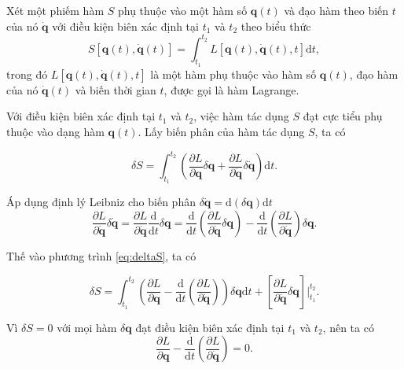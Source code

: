 Xét một phiếm hàm \(S\) phụ thuộc vào một hàm số \(\mathbf{q}(t)\) và đạo hàm theo biến \(t\) của nó \(\mathbf{\dot{q}}\) với điều kiện biên xác định tại \(t_1\) và \(t_2\) theo biểu thức
\begin{equation}
    S \left[\mathbf{q}(t), \mathbf{\dot{q}}(t)\right] = \int_{t_1}^{t_2} L\left[ \mathbf{q}(t), \mathbf{\dot{q}}(t), t \right] \mathrm{d}t,
\end{equation}
trong đó \(L\left[ \mathbf{q}(t), \mathbf{\dot{q}}(t), t \right]\) là một hàm phụ thuộc vào hàm số \(\mathbf{q}(t)\), đạo hàm của nó \(\mathbf{\dot{q}}(t)\) và biến thời gian \(t\), được gọi là hàm Lagrange.

Với điều kiện biên xác định tại \(t_1\) và \(t_2\), việc hàm tác dụng \(S\) đạt cực tiểu phụ thuộc vào dạng hàm \(\mathbf{q}(t)\). Lấy biến phân của hàm tác dụng \(S\), ta có

\begin{equation} \label{eq:deltaS}
    \delta S = \int_{t_1}^{t_2} \left( \frac{\partial L}{\partial \mathbf{q}} \delta \mathbf{q} + \frac{\partial L}{\partial \mathbf{\dot{q}}} \delta \mathbf{\dot{q}} \right) \mathrm{d}t.
\end{equation}

Áp dụng định lý Leibniz cho biến phân \(\delta \mathbf{\dot{q}} = \mathrm{d}\left( \delta \mathbf{q} \right)\mathrm{d}t\)
\begin{equation}
    \dfrac{\partial L}{\partial \mathbf{\dot{q}}} \delta \mathbf{\dot{q}} = \frac{\partial L}{\partial \mathbf{\dot{q}}} \frac{\mathrm{d}}{\mathrm{d}t} \delta \mathbf{q} = \frac{\mathrm{d}}{\mathrm{d}t} \left( \frac{\partial L}{\partial \mathbf{\dot{q}}} \delta \mathbf{q} \right) - \frac{\mathrm{d}}{\mathrm{d}t} \left( \frac{\partial L}{\partial \mathbf{\dot{q}}} \right) \delta \mathbf{q}.
\end{equation}

Thế vào phương trình \eqref{eq:deltaS}, ta có

\begin{equation}
    \delta S = \int_{t_1}^{t_2} \left( \frac{\partial L}{\partial \mathbf{q}} - \frac{\mathrm{d}}{\mathrm{d}t} \left( \frac{\partial L}{\partial \mathbf{\dot{q}}} \right) \right) \delta \mathbf{q} \mathrm{d}t + \left[ \frac{\partial L}{\partial \mathbf{\dot{q}}} \delta \mathbf{q} \right] \Big|_{t_1}^{t_2}.
\end{equation}

Vì \(\delta S = 0\) với mọi hàm \(\delta \mathbf{q}\) đạt điều kiện biên xác định tại \(t_1\) và \(t_2\), nên ta có
\begin{equation} \label{eq:EL}
    \frac{\partial L}{\partial \mathbf{q}} - \frac{\mathrm{d}}{\mathrm{d}t} \left( \frac{\partial L}{\partial \mathbf{\dot{q}}} \right) = 0.
\end{equation}

